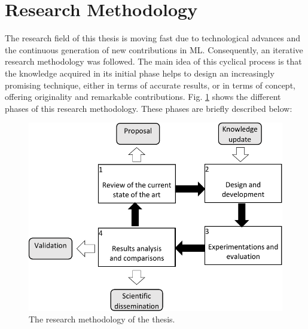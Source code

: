 \section{Research Methodology}
\label{sec:1_introduction_methodology}
The research field of this thesis is moving fast due to technological advances and the continuous generation of new contributions in ML. Consequently, an iterative research methodology was followed. The main idea of this cyclical process is that the knowledge acquired in its initial phase helps to design an increasingly promising technique,
either in terms of accurate results, or in terms of concept, offering originality and remarkable contributions. Fig. \ref{ch1:research-emthodo} shows the different phases of this research methodology.
These phases are briefly described below:

\begin{figure}[!ht]
    \centering
    \includegraphics[width=.8\textwidth]{1_introduction/figures/fig_research-methodo.pdf}
    \caption{The research methodology of the thesis.}
    \label{ch1:research-emthodo}
\end{figure}

